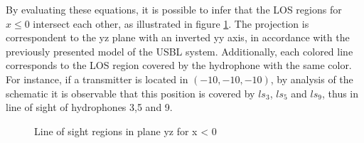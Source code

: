 By evaluating these equations, it is possible to infer that the LOS regions for $x \leq 0$ intersect each other, as illustrated in figure \ref{fig:los-color-s0}. The projection is correspondent to the yz plane with an inverted yy axis, in accordance with the previously presented model of the USBL system. Additionally, each colored line corresponds to the LOS region covered by the hydrophone with the same color. For instance, if a transmitter is located in $(-10,-10,-10)$, by analysis of the schematic it is observable that this position is covered by $ls_3$, $ls_5$ and $ls_9$, thus in line of sight of hydrophones 3,5 and 9.

\begin{figure}[!htbp]
	\captionsetup{justification=centering,margin=2cm}
	\caption{Line of sight regions in plane yz for x < 0}
	\label{fig:los-color-s0}
\end{figure}

